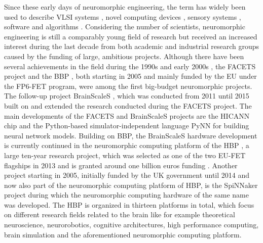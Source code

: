 Since these early days of neuromorphic engineering, the term has widely been used to describe \ac{VLSI} systems \parencite{Mead1989}, novel computing devices \parencite{Schemmel2010}, sensory systems \parencite{Lichtsteiner2008, Liu2010}, software \parencite{Davison2008, Bekolay2014} and algorithms \parencite{ReverterValeiras2016}.
Considering the number of scientists, neuromorphic engineering is still a comparably young field of research but received an increased interest during the last decade from both academic and industrial research groups caused by the funding of large, ambitious projects.
Although there have been several achievements in the field during the 1990s \parencite{Mead1989, Mahowald1992, Indiveri1997, Cauwenberghs1998} and early 2000s \parencite{Liu2002}, the \ac{FACETS} project  and the \ac{BBP} , both starting in 2005 and mainly funded by the \ac{EU} under the FP6-\ac{FET} program, were among the first big-budget neuromorphic projects.
The follow-up project \ac{BrainScaleS}  \parencite{Schemmel2010}, which was conducted from \num{2011} until \num{2015} built on and extended the research conducted during the \ac{FACETS} project.
The main developments of the \ac{FACETS} and \ac{BrainScaleS} projects are the \ac{HICANN} chip \parencite{Schemmel2010} and the Python-based simulator-independent language \ac{PyNN} \parencite{Davison2008} for building neural network models.
Building on \ac{BBP}, the \ac{BrainScaleS} hardware development is currently continued in the neuromorphic computing platform of the \ac{HBP} , a large ten-year research project, which was selected as one of the two \ac{EU}-\ac{FET} flagships in 2013 and is granted around one billion euros funding \parencite{Calimera2013}.
Another project starting in \num{2005}, initially funded by the UK government until 2014 and now also part of the neuromorphic computing platform of \ac{HBP}, is the \ac{SpiNNaker} project \parencite{Furber2014} during which the neuromorphic computing hardware of the same name was developed.
The \ac{HBP} is organized in thirteen platforms in total, which focus on different research fields related to the brain like for example theoretical neuroscience, neurorobotics, cognitive architectures, high performance computing, brain simulation and the aforementioned neuromorphic computing platform.


